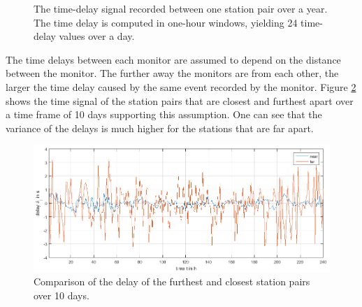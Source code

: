 \documentclass[12pt, sumlimits, intlimits]{article}
\begin{document}
\begin{figure}[ht] 
	\centering 
	\caption{The time-delay signal recorded between one station pair over a year. The time delay is computed in one-hour windows, yielding 24 time-delay values over a day.}
	\label{fig:examplesignal}
\end{figure}

The time delays between each monitor are assumed to depend on the distance between the monitor. The further away the monitors are from each other, the larger the time delay caused by the same event recorded by the monitor. Figure \ref{fig:nearfar} shows the time signal of the station pairs that are closest and furthest apart over a time frame of 10 days supporting this assumption. One can see that the variance of the delays is much higher for the stations that are far apart. 

\begin{figure}[ht]
	\begin{center}   
		\includegraphics[width=\textwidth]{Comparisondelayoverrandomdayoffarestandclosestlinks.png}
	\end{center}
	\caption{Comparison of the delay of the furthest and closest station pairs over 10 days.}\label{fig:nearfar}
\end{figure}
\end{document}
